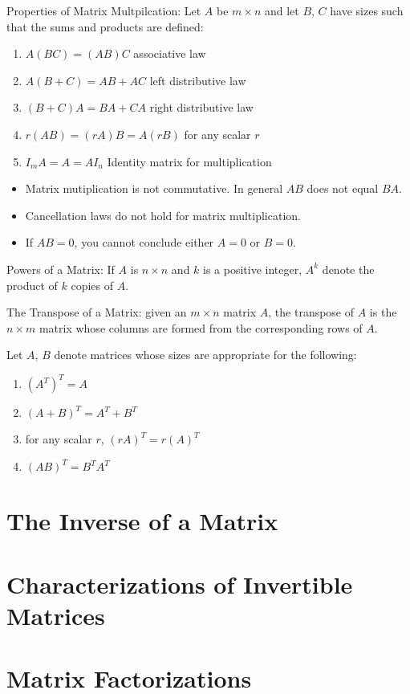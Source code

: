 \documentclass[../linalg.tex]{subfiles}
\begin{document}
Properties of Matrix Multpilcation: Let $A$ be $m\times n$ and let $B$, $C$ have sizes such that the sums and products are defined:
\begin{enumerate}
    \item $A(BC)=(AB)C$ associative law 
    \item $A(B+C)=AB+AC$ left distributive law 
    \item $(B+C)A=BA+CA$ right distributive law 
    \item $r(AB)=(rA)B = A(rB)$ for any scalar $r$
    \item $I_mA=A=AI_n$ Identity matrix for multiplication 
\end{enumerate}
\begin{itemize}
    \item Matrix mutiplication is not commutative. In general $AB$ does not equal $BA$.
    \item Cancellation laws do not hold for matrix multiplication.
    \item If $AB=0$, you cannot conclude either $A=0$ or $B=0$.
\end{itemize}
Powers of a Matrix: If $A$ is $n\times n$ and $k$ is a positive integer, $A^k$ denote the product of $k$ copies of $A$.

The Transpose of a Matrix: given an $m\times n$ matrix $A$, the transpose of $A$ is the $n\times m$ matrix whose columns are formed from the corresponding rows of $A$.
\begin{theorem}[Transpose]
    Let $A$, $B$ denote matrices whose sizes are appropriate for the following:
    \begin{enumerate}
        \item $(A^T)^T=A$
        \item $(A+B)^T=A^T+B^T$
        \item for any scalar $r$, $(rA)^T=r(A)^T$
        \item $(AB)^T=B^TA^T$
    \end{enumerate}
\end{theorem}
\section{The Inverse of a Matrix}
\section{Characterizations of Invertible Matrices}
\section{Matrix Factorizations}
\end{document}
